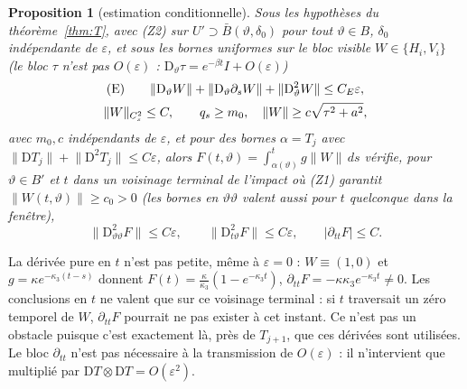 \documentclass[11pt,a4paper]{article}
\newtheorem{proposition}[theoreme]{Proposition}
\theoremstyle{remark}
\newcommand{\vth}{\vartheta}
\newcommand{\D}{\mathrm D}
\begin{document}
\begin{proposition}[estimation conditionnelle]\label{prop:Q}
Sous les hypothèses du théorème~\ref{thm:T}, avec (Z2) sur $U'\supset\bar B(\vth,\delta_0)$ pour tout $\vth\in B$, $\delta_0$ indépendante de $\varepsilon$, et sous les bornes uniformes sur le \emph{bloc visible} $W\in\{H_i,V_i\}$ (le bloc $\tau$ n'est pas $O(\varepsilon)$ : $\D_\vth\tau=e^{-\beta t}I+O(\varepsilon)$)
\[
\begin{gathered}\textup{(E)}\qquad \lVert\D_\vth W\rVert+\lVert\D_\vth\partial_sW\rVert+\lVert\D^2_\vth W\rVert\le C_E\varepsilon,\\ \lVert W\rVert_{C^2_s}\le C,\qquad q_s\ge m_0,\quad \lVert W\rVert\ge c\sqrt{\tau^2+a^2},
\end{gathered}\]
avec $m_0,c$ indépendants de $\varepsilon$, et pour des bornes $\alpha=T_j$ avec $\lVert\D T_j\rVert+\lVert\D^2T_j\rVert\le C\varepsilon$, alors $F(t,\vth)=\int_{\alpha(\vth)}^tg\lVert W\rVert\,ds$ vérifie, pour $\vth\in B'$ et $t$ dans un \emph{voisinage terminal} de l'impact où (Z1) garantit $\lVert W(t,\vth)\rVert\ge c_0>0$ (les bornes en $\vth\vth$ valent aussi pour $t$ quelconque dans la fenêtre),
\[
\boxed{\ \lVert\D^2_{\vth\vth}F\rVert\le C\varepsilon,\qquad\lVert\D^2_{t\vth}F\rVert\le C\varepsilon,\qquad\lvert\partial_{tt}F\rvert\le C.\ }
\]
\end{proposition}
\noindent La dérivée pure en $t$ n'est pas petite, même à $\varepsilon=0$ : $W\equiv(1,0)$ et $g=\kappa e^{-\kappa_3(t-s)}$ donnent $F(t)=\frac{\kappa}{\kappa_3}(1-e^{-\kappa_3t})$, $\partial_{tt}F=-\kappa\kappa_3e^{-\kappa_3t}\ne0$. Les conclusions en $t$ ne valent que sur ce voisinage terminal : si $t$ traversait un zéro temporel de $W$, $\partial_{tt}F$ pourrait ne pas exister à cet instant. Ce n'est pas un obstacle puisque c'est exactement là, près de $T_{j+1}$, que ces dérivées sont utilisées. Le bloc $\partial_{tt}$ n'est pas nécessaire à la transmission de $O(\varepsilon)$ : il n'intervient que multiplié par $\D T\otimes\D T=O(\varepsilon^2)$.
\end{document}

